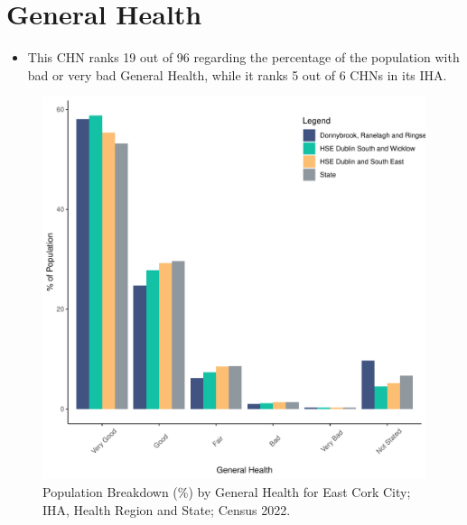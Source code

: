 \documentclass{article}
\begin{document}
\pagebreak

\section{General Health}\label{sect:GenHealth}
\begin{itemize}
\item  This CHN ranks  19 out of 96 regarding the percentage of the population with bad or very bad General Health, while it ranks   5 out of 6 CHNs in its IHA.
\end{itemize}
\begin{figure}[h]
	\centering
	\includegraphics[width = 150mm]{../figures/GenED.pdf}
	\caption{Population Breakdown (\%) by General Health for East Cork City; IHA, Health Region and State;  Census 2022.}
	\label{fig:2ae19629-1a6a-13a3-e055-000000000001}
	\end{figure}
\end{document}
